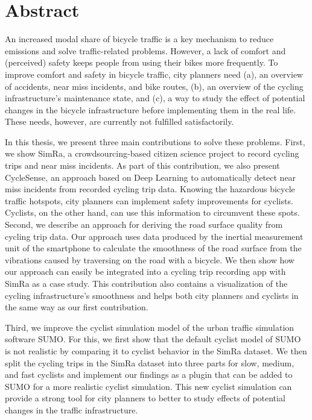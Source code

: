 
\cleardoublepage
{}
\section*{Abstract}
An increased modal share of bicycle traffic is a key mechanism to reduce emissions and solve traffic-related problems.
However, a lack of comfort and (perceived) safety keeps people from using their bikes more frequently.
To improve comfort and safety in bicycle traffic, city planners need (a), an overview of accidents, near miss incidents, and bike routes, (b), an overview of the cycling infrastructure's maintenance state, and (c), a way to study the effect of potential changes in the bicycle infrastructure before implementing them in the real life.
These needs, however, are currently not fulfilled satisfactorily.

In this thesis, we present three main contributions to solve these problems.
First, we show SimRa, a crowdsourcing-based citizen science project to record cycling trips and near miss incidents.
As part of this contribution, we also present CycleSense, an approach based on Deep Learning to automatically detect near miss incidents from recorded cycling trip data.
Knowing the hazardous bicycle traffic hotspots, city planners can implement safety improvements for cyclists.
Cyclists, on the other hand, can use this information to circumvent these spots.
Second, we describe an approach for deriving the road surface quality from cycling trip data.
Our approach uses data produced by the inertial measurement unit of the smartphone to calculate the smoothness of the road surface from the vibrations caused by traversing on the road with a bicycle. 
We then show how our approach can easily be integrated into a cycling trip recording app with SimRa as a case study.
This contribution also contains a visualization of the cycling infrastructure's smoothness and helps both city planners and cyclists in the same way as our first contribution.

Third, we improve the cyclist simulation model of the urban traffic simulation software SUMO.
For this, we first show that the default cyclist model of SUMO is not realistic by comparing it to cyclist behavior in the SimRa dataset.
We then split the cycling trips in the SimRa dataset into three parts for slow, medium, and fast cyclists and implement our findings as a plugin that can be added to SUMO for a more realistic cyclist simulation.
This new cyclist simulation can provide a strong tool for city planners to better to study effects of potential changes in the traffic infrastructure. 


